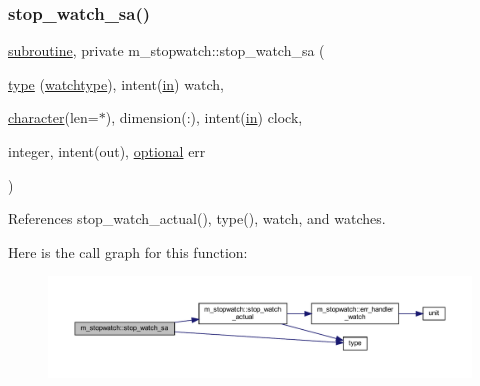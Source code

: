 \subsubsection{\texorpdfstring{stop\+\_\+watch\+\_\+sa()}{stop\_watch\_sa()}}
{\footnotesize\ttfamily \hyperlink{M__stopwatch_83_8txt_acfbcff50169d691ff02d4a123ed70482}{subroutine}, private m\+\_\+stopwatch\+::stop\+\_\+watch\+\_\+sa (\begin{DoxyParamCaption}\item[{\hyperlink{stop__watch_83_8txt_a70f0ead91c32e25323c03265aa302c1c}{type} (\hyperlink{structm__stopwatch_1_1watchtype}{watchtype}), intent(\hyperlink{M__journal_83_8txt_afce72651d1eed785a2132bee863b2f38}{in})}]{watch,  }\item[{\hyperlink{option__stopwatch_83_8txt_abd4b21fbbd175834027b5224bfe97e66}{character}(len=$\ast$), dimension(\+:), intent(\hyperlink{M__journal_83_8txt_afce72651d1eed785a2132bee863b2f38}{in})}]{clock,  }\item[{integer, intent(out), \hyperlink{option__stopwatch_83_8txt_aa4ece75e7acf58a4843f70fe18c3ade5}{optional}}]{err }\end{DoxyParamCaption})\hspace{0.3cm}{\ttfamily [private]}}



References stop\+\_\+watch\+\_\+actual(), type(), watch, and watches.

Here is the call graph for this function\+:
\nopagebreak
\begin{figure}[H]
\begin{center}
\leavevmode
\includegraphics[width=350pt]{namespacem__stopwatch_a7486f3bc54b8bf0313f595151927a56c_cgraph}
\end{center}
\end{figure}
\mbox{\label{namespacem__stopwatch_ad2412b50e118e372b548e3b9317f9ed4}} 
